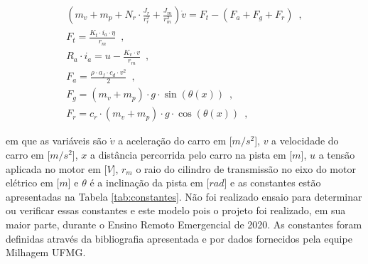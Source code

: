 \begin{subequations}
	\label{eq:modelo_1}
    \begin{align}
        (m_v + m_p + N_r \cdot \frac{J_r}{r_r^2}  + \frac{J_m}{r_m^2}) \dot v = F_t - (F_a + F_g + F_r) \enspace,\\   
        F_{t} =  \frac{K_t \cdot i_a \cdot \eta}{r_m} \enspace,\\
		R_{a} \cdot i_{a} = u - \frac{K_{v} \cdot v}{r_m} \enspace, \\
        F_{a} = \frac{\rho \cdot a_f \cdot c_d \cdot v^2}{2} \enspace,\\
        F_{g} = (m_v + m_p) \cdot g \cdot \sin(\theta(x)) \enspace,\\
        F_{r}  = c_{r} \cdot (m_v + m_p) \cdot g \cdot \cos(\theta(x)) \enspace,
	\end{align}
\end{subequations}

em que as variáveis são $\dot v$ a aceleração 
do carro em [$m/s^2$], $v$ a velocidade do carro em [$m/s^2$], $x$ a distância  percorrida pelo carro na pista em [$m$], 
$u$ a tensão aplicada no motor em [$V$], $r_m$ o raio do cilindro de transmissão no eixo do motor elétrico em [$m$] e $\theta$ é a inclinação da pista em [$rad$] 
e as constantes estão apresentadas na Tabela \ref{tab:constantes}. Não foi realizado ensaio para determinar ou verificar essas constantes e este modelo
pois o projeto foi realizado, em sua maior parte, durante o Ensino Remoto Emergencial de 2020. As constantes foram definidas através da bibliografia apresentada
e por dados fornecidos pela equipe Milhagem UFMG. 


